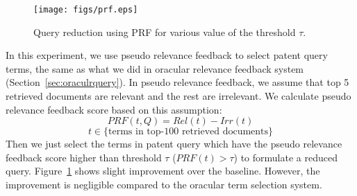 \begin{figure}[t!]
   \centering
   \texttt{[image: figs/prf.eps]}
   \caption{Query reduction using PRF for various value of the threshold $\tau$.}   
   \label{fig:prf} 
\end{figure}
In this experiment, we use pseudo relevance feedback to select patent query terms, the same as what we did in oracular relevance feedback system (Section~\ref{sec:oraculrquery}). In pseudo relevance feedback, we assume that top 5 retrieved documents are relevant and the rest are irrelevant. We calculate pseudo relevance feedback score based on this assumption:  
\begin{equation}
PRF(t,Q)=Rel(t)-Irr(t) 
 \label{eq:score}
\end{equation}
\vspace*{-2ex}
\begin{displaymath}t\in \lbrace \mbox{terms in top-100 retrieved documents}\rbrace\end{displaymath}
Then we just select the terms in patent query which have the pseudo relevance feedback score higher than threshold $\tau$ ($PRF(t)>\tau$) to formulate a reduced query. Figure~\ref{fig:prf} shows slight improvement over the baseline. However, the improvement is negligible compared to the oracular term selection system.
